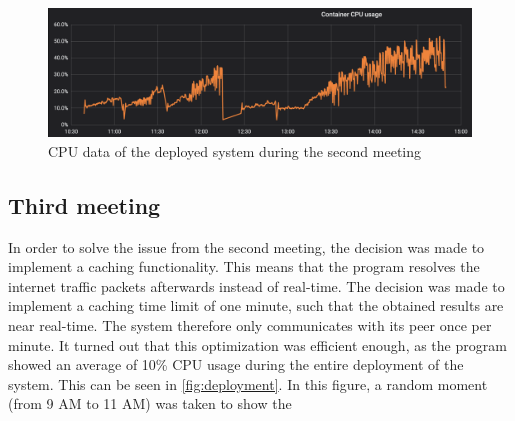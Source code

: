 \begin{figure}
    \centering
    \includegraphics[width=\textwidth]{gfx/load-60.png}
    \caption{CPU data of the deployed system during the second meeting}
    \label{fig:60}
\end{figure}

\subsection{Third meeting}
In order to solve the issue from the second meeting, the decision was made to implement a caching functionality. This means that the program resolves the internet traffic packets afterwards instead of real-time. The decision was made to implement a caching time limit of one minute, such that the obtained results are near real-time. The system therefore only communicates with its peer once per minute. It turned out that this optimization was efficient enough, as the program showed an average of 10\% CPU usage during the entire deployment of the system. This can be seen in \autoref{fig:deployment}. In this figure, a random moment (from 9 AM to 11 AM) was taken to show the 

